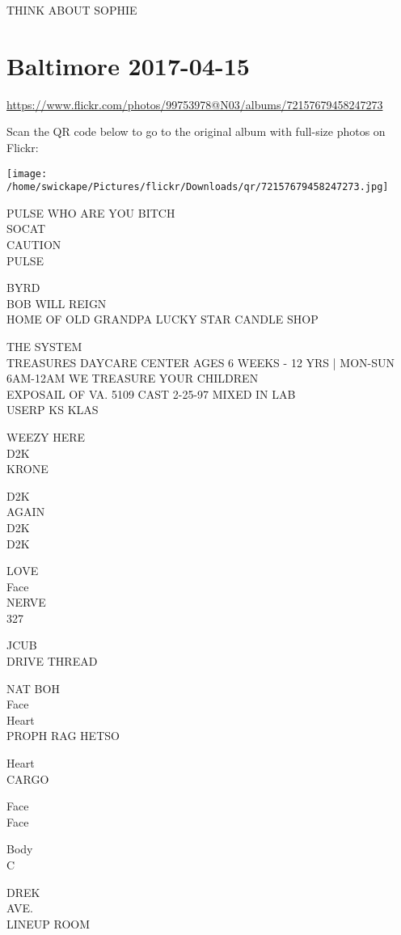 \documentclass[10pt,letterpaper]{article}
\begin{document}
THINK ABOUT SOPHIE


\section*{Baltimore 2017-04-15}

\url{https://www.flickr.com/photos/99753978@N03/albums/72157679458247273}

Scan the QR code below to go to the original album with full-size photos on Flickr:

\texttt{[image: /home/swickape/Pictures/flickr/Downloads/qr/72157679458247273.jpg]}


PULSE WHO ARE YOU BITCH\\
SOCAT\\
CAUTION\\
PULSE

BYRD\\
BOB WILL REIGN\\
HOME OF OLD GRANDPA LUCKY STAR CANDLE SHOP

THE SYSTEM\\
TREASURES DAYCARE CENTER AGES 6 WEEKS {-} 12 YRS | MON{-}SUN 6AM{-}12AM WE TREASURE YOUR CHILDREN\\
EXPOSAIL OF VA. 5109 CAST 2{-}25{-}97 MIXED IN LAB\\
USERP KS KLAS

WEEZY HERE\\
D2K\\
KRONE

D2K\\
AGAIN\\
D2K\\
D2K

LOVE\\
Face\\
NERVE\\
327

JCUB\\
DRIVE THREAD

NAT BOH\\
Face\\
Heart\\
PROPH RAG HETSO

Heart\\
CARGO

Face\\
Face

Body\\
C

DREK\\
AVE.\\
LINEUP ROOM
\end{document}
